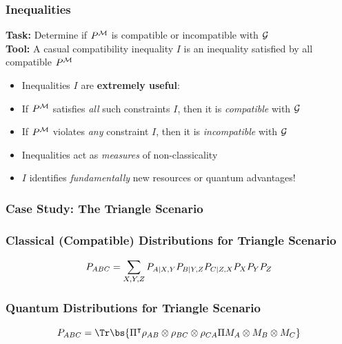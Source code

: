 \documentclass[
    hyperref={bookmarks=false},%
    xcolor={dvipsnames},
]{beamer}
\renewcommand{\term}[1]{\textcolor{Mahogany}{#1}}
\begin{document}
\begin{frame}
    \frametitle{Inequalities}
    \textbf{Task:} Determine if $\prob^{\mscenario}$ is \term{compatible} or \term{incompatible} with $\mathcal{G}$\\
    \vspace{0.3in}
    \textbf{Tool:} A \term{casual compatibility inequality} $I$ is an inequality satisfied by all compatible $\prob^{\mscenario}$
    \vspace{0.3in}
    \begin{itemize}
        \item Inequalities $I$ are \textbf{extremely useful}:
        \item If $\prob^{\mscenario}$ satisfies \textit{all} such constraints $I$, then it is \textit{compatible} with $\mathcal{G}$
        \item If $\prob^{\mscenario}$ violates \textit{any} constraint $I$, then it is \textit{incompatible} with $\mathcal{G}$
        \item Inequalities act as \textit{measures} of non-classicality
        \item $I$ identifies \textit{fundamentally} new resources or quantum advantages!
    \end{itemize}
\end{frame}

\begin{frame}
    \frametitle{Case Study: The Triangle Scenario}
    \begin{center}
        \scalebox{1.5}{}
    \end{center}
\end{frame}

\begin{frame}
    \frametitle{Classical (Compatible) Distributions for Triangle Scenario}
    \[ \prob[ABC] = \sum_{X,Y,Z}\prob[A|X,Y]\prob[B|Y,Z]\prob[C|Z,X]\prob[X]\prob[Y]\prob[Z] \]
    \begin{center}
        \scalebox{1.0}{}
    \end{center}
\end{frame}

\begin{frame}
    \frametitle{Quantum Distributions for Triangle Scenario}
    \[ \prob[ABC] = \Tr\bs{\netperm^\intercal \rho_{AB}\otimes\rho_{BC}\otimes\rho_{CA} \netperm M_{A}\otimes M_{B} \otimes M_{C}} \]
    \begin{center}
        \scalebox{1.0}{}
    \end{center}
\end{frame}
\end{document}
